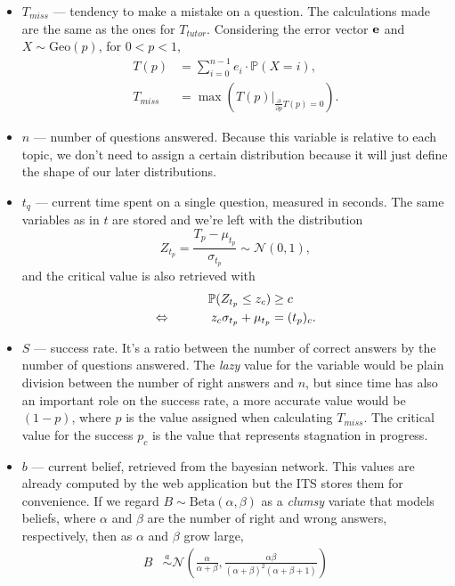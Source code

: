 \documentclass{article}
\newcommand{\0}{\mathbbold{0}}
\newcommand{\1}{\mathds{1}}
\newcommand{\Beta}[2]{\text{Beta}\!\left(#1,#2\right)}
\newcommand{\LRA}{\Leftrightarrow\mkern40mu}
\begin{document}
\begin{itemize} 
    \item $T_{miss}$ — tendency to make a mistake on a question. The calculations made are the same as the ones for $T_{tutor}$. Considering the error vector ${\bf e}$ and $X \sim \text{Geo}(p)$, for $0<p<1$,
    \begin{align*}
        T(p) &= \sum_{i=0}^{n-1} e_i \cdot \mathbb{P}(X = i), \\
        T_{miss} &= \max\left(\left.T(p)\right|_{\frac{\partial}{\partial p}T(p) = 0}\right).
    \end{align*}
    \item $n$ — number of questions answered. Because this variable is relative to each topic, we don't need to assign a certain distribution because it will just define the shape of our later distributions.
    \item $t_q$ — current time spent on a single question, measured in seconds. The same variables as in $t$ are stored and we're left with the distribution
    $$ Z_{t_p} = \frac{T_p-\mu_{t_p}}{\sigma_{t_p}} \sim \mathcal{N}(0,1), $$
    and the critical value is also retrieved with
    \begin{alignat*}{2}
        && \mathbb{P}(Z_{t_p} \le z_c) &\ge c \\
        \LRA && z_c\sigma_{t_p} + \mu_{t_p} &= (t_p)_c.
    \end{alignat*}
    \item $S$ — success rate. It's a ratio between the number of correct answers by the number of questions answered. The \textsl{lazy} value for the variable would be plain division between the number of right answers and $n$, but since time has also an important role on the success rate, a more accurate value would be $(1-p)$, where $p$ is the value assigned when calculating $T_{miss}$. The critical value for the success $p_c$ is the value that represents stagnation in progress.
    \item $b$ — current belief, retrieved from the bayesian network. This values are already computed by the web application but the ITS stores them for convenience. If we regard $B \sim \Beta{\alpha}{\beta}$ as a \textsl{clumsy} variate that models beliefs, where $\alpha$ and $\beta$ are the number of right and wrong answers, respectively, then as $\alpha$ and $\beta$ grow large,
    \begin{align*}
        B &\overset{a}{\sim} \mathcal{N}\!\left(\frac{\alpha}{\alpha+\beta}, \frac{\alpha\beta}{(\alpha+\beta)^2(\alpha+\beta+1)}\right) \\

\end{align*}
\end{itemize}
\end{document}
